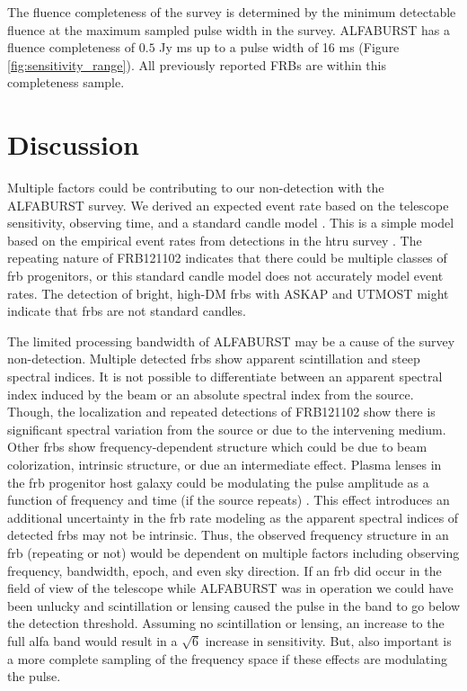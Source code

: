 \documentclass[a4paper,fleqn,usenatbib]{mnras}
\begin{document}


The fluence completeness of the survey \citep{2015MNRAS.447.2852K} is determined
by the minimum detectable fluence at the maximum sampled pulse width in the
survey. ALFABURST has a fluence completeness of $0.5$ Jy ms up to a pulse width
of 16 ms (Figure \ref{fig:sensitivity_range}). All previously reported FRBs are
within this completeness sample.


\section{Discussion}
\label{sec:discuss}

Multiple factors could be contributing to our non-detection with the ALFABURST
survey. We derived an expected event rate based on the telescope sensitivity,
observing time, and a standard candle model \citep{2013MNRAS.436L...5L}. This is
a simple model based on the empirical event rates from detections in the
\gls{htru} survey \citep{2013Sci...341...53T}. The repeating nature of
FRB121102 indicates that there could be multiple classes of \gls{frb}
progenitors, or this standard candle model does not accurately model event
rates. The detection of bright, high-DM \glspl{frb} with ASKAP
\citep{2017ApJ...841L..12B} and UTMOST \citep{2017MNRAS.468.3746C,atel10697}
might indicate that \glspl{frb} are not standard candles.

The limited processing bandwidth of ALFABURST may be a cause of the survey
non-detection. Multiple detected \glspl{frb} show apparent scintillation and
steep spectral indices. It is not possible to differentiate between an apparent
spectral index induced by the beam or an absolute spectral index from the
source. Though, the localization and repeated detections of FRB121102 show there
is significant spectral variation from the source or due to the intervening
medium. Other \glspl{frb} show frequency-dependent structure which could be due
to beam colorization, intrinsic structure, or due an intermediate effect. Plasma
lenses in the \gls{frb} progenitor host galaxy could be modulating the pulse
amplitude as a function of frequency and time (if the source repeats)
\citep{2017ApJ...842...35C}. This effect introduces an additional uncertainty in
the \gls{frb} rate modeling as the apparent spectral indices of detected
\glspl{frb} may not be intrinsic. Thus, the observed frequency structure in an
\gls{frb} (repeating or not) would be dependent on multiple factors including
observing frequency, bandwidth, epoch, and even sky direction. If an \gls{frb}
did occur in the field of view of the telescope while ALFABURST was in operation
we could have been unlucky and scintillation or lensing caused the pulse in the
band to go below the detection threshold. Assuming no scintillation or lensing,
an increase to the full \gls{alfa} band would result in a $\sqrt{6}$ increase in
sensitivity. But, also important is a more complete sampling of the frequency
space if these effects are modulating the pulse.
\end{document}
